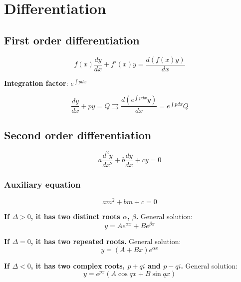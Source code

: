 \documentclass[a4paper,9pt]{scrartcl}
\begin{document}
    \section{Differentiation}

    \subsection{First order differentiation}

    \begin{displaymath}
        f(x) \frac{dy}{dx} + f'(x) y = \frac{d(f(x) y )}{dx}
    \end{displaymath}

    \textbf{Integration factor}: $\boxed{e^{\int{p}dx}}$

    \begin{displaymath}
        \frac{dy}{dx}+py=Q \rightrightarrows \frac{d(\boxed{e^{\int{p}dx}}y)}{dx} = \boxed{e^{\int{p}dx}} Q
    \end{displaymath}

    \subsection{Second order differentiation}

    \begin{displaymath}
        a\frac{d^{2}y}{dx^2} + b\frac{dy}{dx} + cy = 0
    \end{displaymath}

    \subsubsection{Auxiliary equation}
    \begin{displaymath}
        am^2 + bm + c = 0
    \end{displaymath}

    \textbf{If $\Delta > 0$, it has two distinct roots $\alpha$, $\beta$.}
    General solution:
    \begin{displaymath}
        y = Ae^{{\alpha}x} + Be^{{\beta}x}
    \end{displaymath}

    \textbf{If $\Delta = 0$, it has two repeated roots.}
    General solution:
    \begin{displaymath}
        y = (A+Bx)e^{{\alpha}x}
    \end{displaymath}

    \textbf{If $\Delta < 0$, it has two complex roots, $p + qi$ and $p - qi$. }
    General solution:
    \begin{displaymath}
        y = e^{px}(A\cos{qx}+B\sin{qx})
    \end{displaymath}
\end{document}
